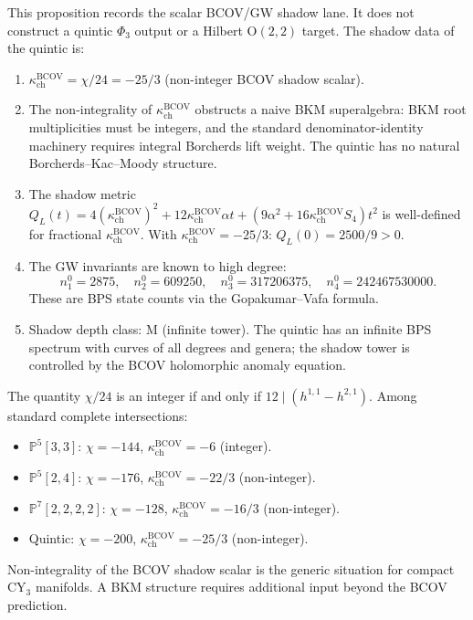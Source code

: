 \begin{proposition}
\label{prop:quintic-shadow}
This proposition records the scalar BCOV/GW shadow lane. It does not
construct a quintic \(\Phi_3\) output or a Hilbert
\(\mathrm{O}(2,2)\) target. The shadow data of the quintic is:
\begin{enumerate}[label=(\roman*)]
 \item $\kappa_{\mathrm{ch}}^{\mathrm{BCOV}} = \chi/24 = -25/3$ \textup{(}non-integer BCOV shadow scalar\textup{)}.
 \item The non-integrality of $\kappa_{\mathrm{ch}}^{\mathrm{BCOV}}$ obstructs a naive BKM superalgebra: BKM root multiplicities must be integers, and the standard denominator-identity machinery requires integral Borcherds lift weight. The quintic has no natural Borcherds--Kac--Moody structure.
 \item The shadow metric $Q_L(t) = 4(\kappa_{\mathrm{ch}}^{\mathrm{BCOV}})^2 + 12\kappa_{\mathrm{ch}}^{\mathrm{BCOV}}\alpha t + (9\alpha^2 + 16\kappa_{\mathrm{ch}}^{\mathrm{BCOV}} S_4) t^2$ is well-defined for fractional $\kappa_{\mathrm{ch}}^{\mathrm{BCOV}}$. With $\kappa_{\mathrm{ch}}^{\mathrm{BCOV}} = -25/3$: $Q_L(0) = 2500/9 > 0$.
 \item The GW invariants are known to high degree:
 \[
 n^0_1 = 2875, \quad n^0_2 = 609250, \quad n^0_3 = 317206375, \quad n^0_4 = 242467530000.
 \]
 These are BPS state counts via the Gopakumar--Vafa formula.
 \item Shadow depth class: M \textup{(}infinite tower\textup{)}. The quintic has an infinite BPS spectrum with curves of all degrees and genera; the shadow tower is controlled by the BCOV holomorphic anomaly equation.
\end{enumerate}
\end{proposition}

\begin{remark}
\label{rem:chi-24-integrality}
The quantity $\chi/24$ is an integer if and only if $12 \mid (h^{1,1} - h^{2,1})$. Among standard complete intersections:
\begin{itemize}
 \item $\mathbb{P}^5[3,3]$: $\chi = -144$, $\kappa_{\mathrm{ch}}^{\mathrm{BCOV}} = -6$ (integer).
 \item $\mathbb{P}^5[2,4]$: $\chi = -176$, $\kappa_{\mathrm{ch}}^{\mathrm{BCOV}} = -22/3$ (non-integer).
 \item $\mathbb{P}^7[2,2,2,2]$: $\chi = -128$, $\kappa_{\mathrm{ch}}^{\mathrm{BCOV}} = -16/3$ (non-integer).
 \item Quintic: $\chi = -200$, $\kappa_{\mathrm{ch}}^{\mathrm{BCOV}} = -25/3$ (non-integer).
\end{itemize}
Non-integrality of the BCOV shadow scalar is the generic situation for compact CY$_3$ manifolds. A BKM structure requires additional input beyond the BCOV prediction.
\end{remark}

